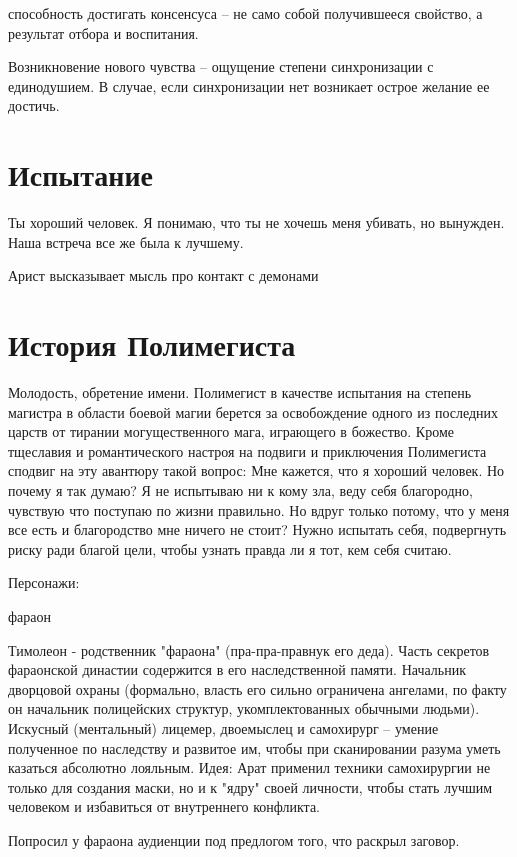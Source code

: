 \documentclass[12pt,a4paper]{article}
\begin{document}
способность достигать консенсуса -- не само собой получившееся свойство, а результат отбора и воспитания.

Возникновение нового чувства -- ощущение степени синхронизации с единодушием. В случае, если синхронизации нет возникает острое желание ее достичь.

\section*{Испытание}

Ты хороший человек. Я понимаю, что ты не хочешь меня убивать, но вынужден. Наша встреча все же была к лучшему.

Арист высказывает мысль про контакт с демонами


\section*{История Полимегиста}

Молодость, обретение имени. 
Полимегист в качестве испытания на степень магистра в области боевой магии берется за освобождение одного из последних царств от тирании могущественного мага, играющего в божество.
Кроме тщеславия и романтического настроя на подвиги и приключения Полимегиста сподвиг на эту авантюру такой вопрос: Мне кажется, что я хороший человек. Но почему я так думаю? Я не испытываю ни к кому зла, веду себя благородно, чувствую что поступаю по жизни правильно. Но вдруг только потому, что у меня все есть и благородство мне ничего не стоит? Нужно испытать себя, подвергнуть риску ради благой цели, чтобы узнать правда ли я тот, кем себя считаю.

Персонажи:

фараон

Тимолеон - родственник "фараона" (пра-пра-правнук его деда). Часть секретов фараонской династии содержится в его наследственной памяти. Начальник дворцовой охраны (формально, власть его сильно ограничена ангелами, по факту он начальник полицейских структур, укомплектованных обычными людьми). Искусный (ментальный) лицемер, двоемыслец и самохирург -- умение полученное по наследству и развитое им, чтобы при сканировании разума уметь казаться абсолютно лояльным. Идея: Арат применил техники самохирургии не только для создания маски, но и к "ядру" своей личности, чтобы стать лучшим человеком и избавиться от внутреннего конфликта.


Попросил у фараона аудиенции под предлогом того, что раскрыл заговор.
\end{document}
